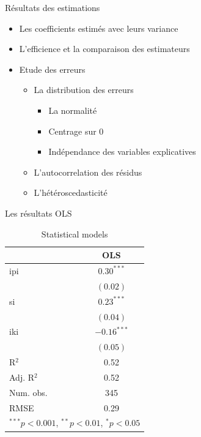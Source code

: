 \documentclass[11pt,ignorenonframetext,]{beamer}
\providecommand{\tightlist}{%
  \setlength{\itemsep}{0pt}\setlength{\parskip}{0pt}}
\begin{document}
\begin{frame}{Résultats des estimations}
\protect\hypertarget{resultats-des-estimations}{}

\begin{itemize}
\tightlist
\item
  Les coefficients estimés avec leurs variance
\item
  L'efficience et la comparaison des estimateurs
\item
  Etude des erreurs

  \begin{itemize}
  \tightlist
  \item
    La distribution des erreurs

    \begin{itemize}
    \tightlist
    \item
      La normalité
    \item
      Centrage sur 0
    \item
      Indépendance des variables explicatives
    \end{itemize}
  \item
    L'autocorrelation des résidus
  \item
    L'hétéroscedasticité
  \end{itemize}
\end{itemize}

\end{frame}

\begin{frame}{Les résultats OLS}
\protect\hypertarget{les-resultats-ols}{}

\tiny

\begin{table}
\begin{center}
\begin{tabular}{l c }
\hline
 & OLS \\
\hline
ipi        & $0.30^{***}$  \\
           & $(0.02)$      \\
si         & $0.23^{***}$  \\
           & $(0.04)$      \\
iki        & $-0.16^{***}$ \\
           & $(0.05)$      \\
\hline
R$^2$      & 0.52          \\
Adj. R$^2$ & 0.52          \\
Num. obs.  & 345           \\
RMSE       & 0.29          \\
\hline
\multicolumn{2}{l}{\scriptsize{$^{***}p<0.001$, $^{**}p<0.01$, $^*p<0.05$}}
\end{tabular}
\caption{Statistical models}
\label{table : ols}
\end{center}
\end{table}

\normalsize

\end{frame}
\end{document}
